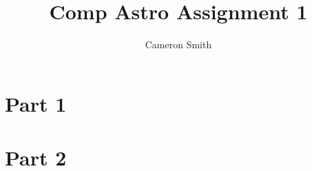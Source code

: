 \documentclass{article}
\title{Comp Astro Assignment 1}
\author{Cameron Smith }
\begin{document}
\maketitle

\section{Part 1}



\section{Part 2}
\end{document}
